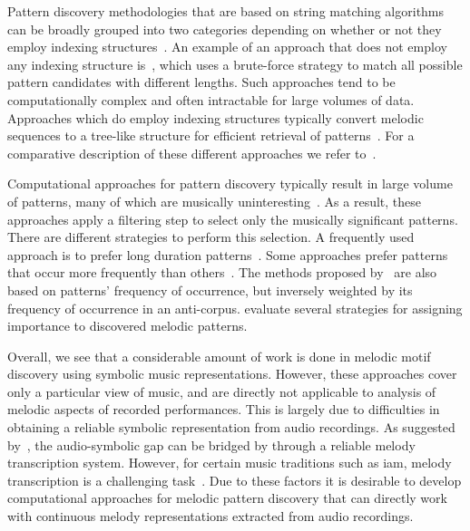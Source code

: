 Pattern discovery methodologies that are based on string matching algorithms can be broadly grouped into two categories depending on whether or not they employ indexing structures~\citep{Janssen2013}. An example of an approach that does not employ any indexing structure is~\cite{nieto2012perceptual}, which uses a brute-force strategy to match all possible pattern candidates with different lengths. Such approaches tend to be computationally complex and often intractable for large volumes of data. Approaches which do employ indexing structures typically convert melodic sequences to a tree-like structure for efficient retrieval of patterns~\citep{Knopke2009,conklin2011comparative}. For a comparative description of these different approaches we refer to~\citep{Janssen2013,meredith2002algorithms}.

Computational approaches for pattern discovery typically result in large volume of patterns, many of which are musically uninteresting~\citep{marsden2012counselling,conklin2010discovery}. As a result, these approaches apply a filtering step to select only the musically significant patterns. There are different strategies to perform this selection. A frequently used approach is to prefer long duration patterns~\citep{Cambouropoulos2006,Karydis2006}. Some approaches prefer patterns that occur more frequently than others~\citep{Cambouropoulos2006,meredith2002algorithms}. The methods proposed by~\cite{conklin2010discovery,Conklin2010a} are also based on patterns' frequency of occurrence, but inversely weighted by its frequency of occurrence in an anti-corpus. \cite{collins2011modeling} evaluate several strategies for assigning importance to discovered melodic patterns.

Overall, we see that a considerable amount of work is done in melodic motif discovery using symbolic music representations. However, these approaches cover only a particular view of music, and are directly not applicable to analysis of melodic aspects of recorded performances. This is largely due to difficulties in obtaining a reliable symbolic representation from audio recordings. As suggested by~\cite{collins2014bridging}, the audio-symbolic gap can be bridged by through a reliable melody transcription system. However, for certain music traditions such as \gls{iam}, melody transcription is a challenging task~\citep{widdess1994involving}. Due to these factors it is desirable to develop computational approaches for melodic pattern discovery that can directly work with continuous melody representations extracted from audio recordings.


